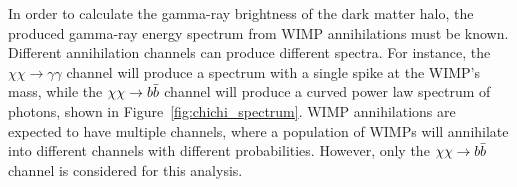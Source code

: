     
    
    
    
    In order to calculate the gamma-ray brightness of the dark matter halo, the produced gamma-ray energy spectrum from WIMP annihilations must be known.
    Different annihilation channels can produce different spectra.
    For instance, the $\chi\chi \rightarrow \gamma\gamma$ channel will produce a spectrum with a single spike at the WIMP's mass, while the $\chi\chi \rightarrow \bbbar{}$ channel will produce a curved power law spectrum of photons, shown in Figure~\ref{fig:chichi_spectrum}.
    WIMP annihilations are expected to have multiple channels, where a population of WIMPs will annihilate into different channels with different probabilities.
    However, only the $\chi\chi \rightarrow \bbbar$ channel is considered for this analysis.
    
